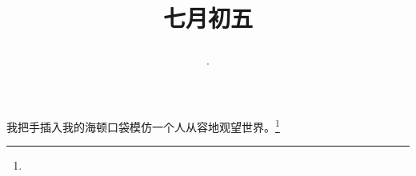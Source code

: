 \title{\date[d=8,m=8,y=2024][year:cn-y,年,month:cn,day:cn,日,·,weekday]·七月初五 }
我把手插入我的海顿口袋模仿一个人从容地观望世界。\footnote{ }

